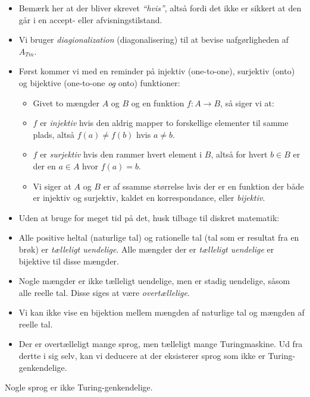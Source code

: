 \begin{frame}[allowframebreaks]
\begin{itemize}
		\item Bemærk her at der bliver skrevet \textit{``hvis''}, altså fordi det ikke er sikkert at den går i en accept- eller afvisningstilstand.
		\item Vi bruger \textit{diagionalization} (diagonalisering) til at bevise uafgørligheden af $A_{Tm}$.
		\item Først kommer vi med en reminder på injektiv (one-to-one), surjektiv (onto) og bijektive (one-to-one \textit{og} onto) funktioner:
		      \begin{itemize}
			      \item Givet to mængder $A$ og $B$ og en funktion $f : A \rightarrow B$, så siger vi at:
			      \item $f$ er \textit{injektiv} hvis den aldrig mapper to forskellige elementer til samme plads, altså $f(a) \ne f(b)$ hvis $a \ne b$.
			      \item $f$ er \textit{surjektiv} hvis den rammer hvert element i $B$, altså for hvert $b \in B$ er der en $a \in A$ hvor $f(a) = b$.
			      \item Vi siger at $A$ og $B$ er af ssamme størrelse hvis der er en funktion der både er injektiv og surjektiv, kaldet en korrespondance, eller \textit{bijektiv}.
		      \end{itemize}
		\item Uden at bruge for meget tid på det, husk tilbage til diskret matematik:
		\item Alle positive heltal (naturlige tal) og rationelle tal (tal som er resultat fra en brøk) er \textit{tælleligt uendelige}. Alle mængder der er \textit{tælleligt uendelige} er bijektive til disse mængder.
		\item Nogle mængder er ikke tælleligt uendelige, men er stadig uendelige, såsom alle reelle tal. Disse siges at være \textit{overtællelige}.
		\item Vi kan ikke vise en bijektion mellem mængden af naturlige tal og mængden af reelle tal.
		\item Der er overtælleligt mange sprog, men tælleligt mange Turingmaskine. Ud fra dertte i sig selv, kan vi deducere at der eksisterer sprog som ikke er Turing-genkendelige.
	\end{itemize}

	\begin{corollary}
		Nogle sprog er ikke Turing-genkendelige.
	\end{corollary}


\end{frame}
